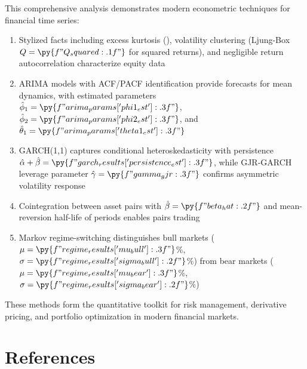 \documentclass[a4paper, 11pt]{article}
\begin{document}
This comprehensive analysis demonstrates modern econometric techniques for financial time
series:

\begin{enumerate}
\item Stylized facts including excess kurtosis (),
      volatility clustering (Ljung-Box $Q = \py{f"{Q_squared:.1f}"}$ for squared returns),
      and negligible return autocorrelation characterize equity data
\item ARIMA models with ACF/PACF identification provide forecasts for mean dynamics,
      with estimated parameters $\hat{\phi}_1 = \py{f"{arima_params['phi1_est']:.3f}"}$,
      $\hat{\phi}_2 = \py{f"{arima_params['phi2_est']:.3f}"}$, and
      $\hat{\theta}_1 = \py{f"{arima_params['theta1_est']:.3f}"}$
\item GARCH(1,1) captures conditional heteroskedasticity with persistence
      $\hat{\alpha} + \hat{\beta} = \py{f"{garch_results['persistence_est']:.3f}"}$,
      while GJR-GARCH leverage parameter $\hat{\gamma} = \py{f"{gamma_gjr:.3f}"}$
      confirms asymmetric volatility response
\item Cointegration between asset pairs with $\hat{\beta} = \py{f"{beta_hat:.2f}"}$ and
      mean-reversion half-life of  periods enables pairs trading
\item Markov regime-switching distinguishes bull markets ($\mu = \py{f"{regime_results['mu_bull']:.3f}"}$\%,
      $\sigma = \py{f"{regime_results['sigma_bull']:.2f}"}$\%) from bear markets
      ($\mu = \py{f"{regime_results['mu_bear']:.3f}"}$\%,
      $\sigma = \py{f"{regime_results['sigma_bear']:.2f}"}$\%)
\end{enumerate}

These methods form the quantitative toolkit for risk management, derivative pricing, and
portfolio optimization in modern financial markets.

\section*{References}
\end{document}
